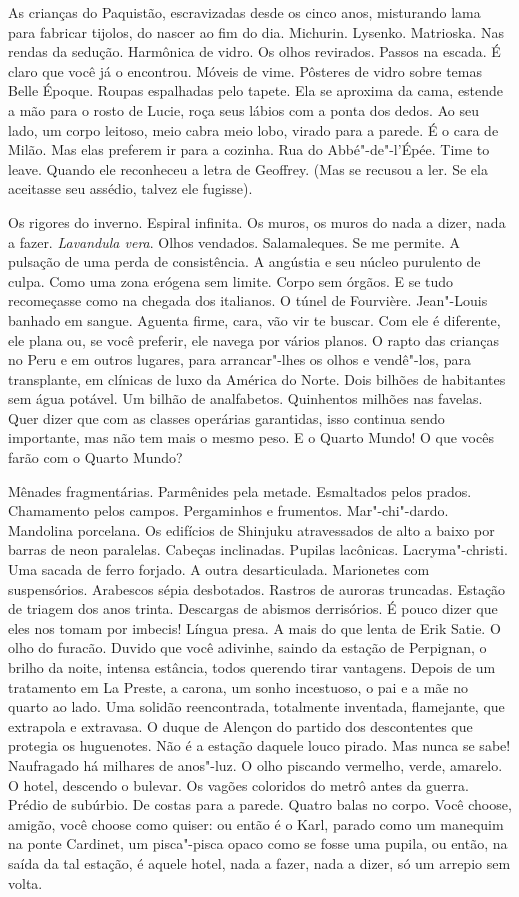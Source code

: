 As crianças do Paquistão, escravizadas desde os cinco anos, misturando
lama para fabricar tijolos, do nascer ao fim do dia. Michurin. Lysenko.
Matrioska. Nas rendas da sedução. Harmônica de vidro. Os olhos
revirados. Passos na escada. É claro que você já o encontrou. Móveis de
vime. Pôsteres de vidro sobre temas Belle Époque. Roupas espalhadas pelo
tapete. Ela se aproxima da cama, estende a mão para o rosto de Lucie,
roça seus lábios com a ponta dos dedos. Ao seu lado, um corpo leitoso,
meio cabra meio lobo, virado para a parede. É o cara de Milão. Mas elas
preferem ir para a cozinha. Rua do Abbé"-de"-l'Épée. Time to leave. Quando
ele reconheceu a letra de Geoffrey. (Mas se recusou a ler. Se ela
aceitasse seu assédio, talvez ele fugisse).

Os rigores do inverno. Espiral infinita. Os muros, os muros do nada a
dizer, nada a fazer. \emph{Lavandula vera}. Olhos vendados.
Salamaleques. Se me permite. A pulsação de uma perda de consistência. A
angústia e seu núcleo purulento de culpa. Como uma zona erógena sem
limite. Corpo sem órgãos. E se tudo recomeçasse como na chegada dos
italianos. O túnel de Fourvière. Jean"-Louis banhado em sangue. Aguenta
firme, cara, vão vir te buscar. Com ele é diferente, ele plana ou, se
você preferir, ele navega por vários planos. O rapto das crianças no
Peru e em outros lugares, para arrancar"-lhes os olhos e vendê"-los, para
transplante, em clínicas de luxo da América do Norte. Dois bilhões de
habitantes sem água potável. Um bilhão de analfabetos. Quinhentos
milhões nas favelas. Quer dizer que com as classes operárias garantidas,
isso continua sendo importante, mas não tem mais o mesmo peso. E o
Quarto Mundo! O que vocês farão com o Quarto Mundo?

Mênades fragmentárias. Parmênides pela metade. Esmaltados pelos prados.
Chamamento pelos campos. Pergaminhos e frumentos. Mar"-chi"-dardo.
Mandolina porcelana. Os edifícios de Shinjuku atravessados de alto a
baixo por barras de neon paralelas. Cabeças inclinadas. Pupilas
lacônicas. Lacryma"-christi. Uma sacada de ferro forjado. A outra
desarticulada. Marionetes com suspensórios. Arabescos sépia desbotados.
Rastros de auroras truncadas. Estação de triagem dos anos trinta.
Descargas de abismos derrisórios. É pouco dizer que eles nos tomam por
imbecis! Língua presa. A mais do que lenta de Erik Satie. O olho do
furacão. Duvido que você adivinhe, saindo da estação de Perpignan, o
brilho da noite, intensa estância, todos querendo tirar vantagens.
Depois de um tratamento em La Preste, a carona, um sonho incestuoso, o
pai e a mãe no quarto ao lado. Uma solidão reencontrada, totalmente
inventada, flamejante, que extrapola e extravasa. O duque de Alençon do
partido dos descontentes que protegia os huguenotes. Não é a estação
daquele louco pirado. Mas nunca se sabe! Naufragado há milhares de
anos"-luz. O olho piscando vermelho, verde, amarelo. O hotel, descendo o
bulevar. Os vagões coloridos do metrô antes da guerra. Prédio de
subúrbio. De costas para a parede. Quatro balas no corpo. Você choose,
amigão, você choose como quiser: ou então é o Karl, parado como um
manequim na ponte Cardinet, um pisca"-pisca opaco como se fosse uma
pupila, ou então, na saída da tal estação, é aquele hotel, nada a fazer,
nada a dizer, só um arrepio sem volta.

